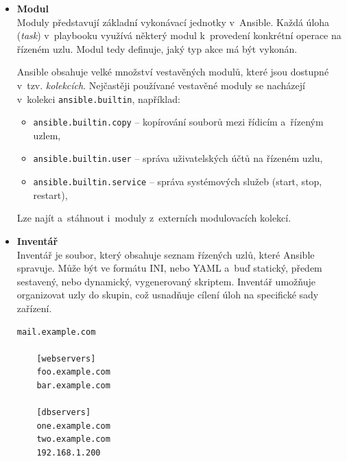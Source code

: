 \begin{itemize}
\begin{lstlisting}[language=YAML, caption={Ansible - ukázka playbooku}, label={lst:ansibleplaybook}, captionpos=b]
      tasks:
        - name: Ensure postgresql is at the latest version
          ansible.builtin.yum:
            name: postgresql
            state: latest

        - name: Ensure that postgresql is started
          ansible.builtin.service:
            name: postgresql
            state: started
    \end{lstlisting}


    \item \textbf{Modul} \\
    Moduly představují základní vykonávací jednotky v~Ansible. Každá úloha (\textit{task}) v~playbooku využívá některý 
    modul k~provedení konkrétní operace na řízeném uzlu. Modul tedy definuje, jaký typ akce má být vykonán.
    
    Ansible obsahuje velké množství vestavěných modulů, které jsou dostupné v~tzv. \textit{kolekcích}. 
    Nejčastěji používané vestavěné moduly se nacházejí v~kolekci \texttt{ansible.builtin}, například:

    \begin{itemize}
        \item \texttt{ansible.builtin.copy} – kopírování souborů mezi řídicím a~řízeným uzlem,
        \item \texttt{ansible.builtin.user} – správa uživatelských účtů na řízeném uzlu,
        \item \texttt{ansible.builtin.service} – správa systémových služeb (start, stop, restart),
    \end{itemize}

    Lze najít a~stáhnout i~moduly z~externích modulovacích kolekcí. \cite{ansibledocs}
    \item \textbf{Inventář} \\
    Inventář je soubor, který obsahuje seznam řízených uzlů, které Ansible spravuje.
    Může být ve formátu INI, nebo YAML a~buď statický, předem sestavený, nebo dynamický, vygenerovaný skriptem.
    Inventář umožňuje organizovat uzly do skupin, což usnadňuje cílení úloh na specifické sady zařízení. \cite{ansibledocs}
    \clearpage
    \begin{lstlisting}[caption={Ansible - ukázka INI inventáře}, label={lst:ansibleiniinventory}, captionpos=b]
    mail.example.com

    [webservers]
    foo.example.com
    bar.example.com

    [dbservers]
    one.example.com
    two.example.com
    192.168.1.200
    \end{lstlisting}


\end{itemize}
